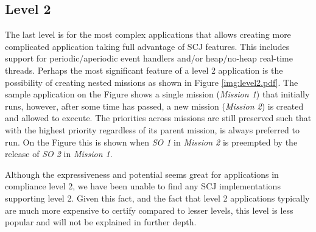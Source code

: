 \subsection{Level 2}
The last level is for the most complex applications that allows creating more complicated application taking full advantage of SCJ features. This includes support for periodic/aperiodic event handlers and/or heap/no-heap real-time threads. Perhaps the most significant feature of a level 2 application is the possibility of creating nested missions as shown in Figure \ref{img:level2.pdf}. The sample application on the Figure shows a single mission (\textit{Mission 1}) that initially runs, however, after some time has passed, a new mission (\textit{Mission 2}) is created and allowed to execute. The priorities across missions are still preserved such that  with the highest priority regardless of its parent mission, is always preferred to run. On the Figure this is shown when \textit{SO 1} in \textit{Mission 2} is preempted by the release of \textit{SO 2} in \textit{Mission 1}.


Although the expressiveness and potential seems great for applications in compliance level 2, we have been unable to find any SCJ implementations supporting level 2. Given this fact, and the fact that level 2 applications typically are much more expensive to certify compared to lesser levels, this level is less popular and will not be explained in further depth. 